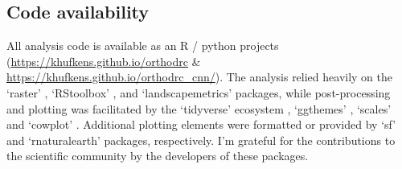 \documentclass[remote sensing,article,submit,moreauthors,pdftex]{mdpi}
\begin{document}
\hypertarget{code-availability}{%
\subsection{Code availability}\label{code-availability}}

All analysis code is available as an R / python \citep{rcoreteam2019}
projects (\url{https://khufkens.github.io/orthodrc} \&
\url{https://khufkens.github.io/orthodrc_cnn/}). The analysis relied
heavily on the `raster' \citep{hijmans2019}, `RStoolbox'
\citep{leutner2019}, and `landscapemetrics' \citep{hesselbarth2019}
packages, while post-processing and plotting was facilitated by the
`tidyverse' ecosystem \citep{wickham2017}, `ggthemes'
\citep{arnold2019}, `scales' \citep{wickham2018} and `cowplot'
\citep{wilke2019}. Additional plotting elements were formatted or
provided by `sf' \citep{pebesma2018} and `rnaturalearth'
\citep{south2017} packages, respectively. I'm grateful for the
contributions to the scientific community by the developers of these
packages.

%

\vspace{6pt}


\end{document}
